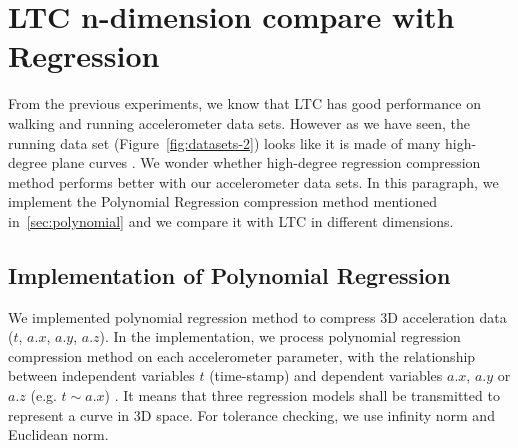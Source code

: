 \section{LTC n-dimension compare with Regression}


From the previous experiments, we know that LTC has good performance on  walking
and running accelerometer data sets. However as we have seen, the running data set
(Figure~\ref{fig:datasets-2}) looks like it is made of many high-degree plane
curves .
We wonder whether high-degree regression compression method performs
better with our accelerometer data sets. In this paragraph, we implement the
Polynomial Regression compression method mentioned in~\ref{sec:polynomial} and we compare it with
LTC in different dimensions.


\subsection{Implementation of Polynomial Regression}

We implemented polynomial regression method to compress 3D acceleration data
($t$, $a.x$, $a.y$, $a.z$). In the implementation, we process polynomial
regression compression method on each accelerometer parameter, with the
relationship between independent variables $t$ (time-stamp) and dependent
variables $a.x$, $a.y$ or $a.z$ (e.g. $t \sim a.x$) .
 It means that three regression
models shall be transmitted to represent a curve in 3D space. For tolerance
checking, we use infinity norm and Euclidean norm.

